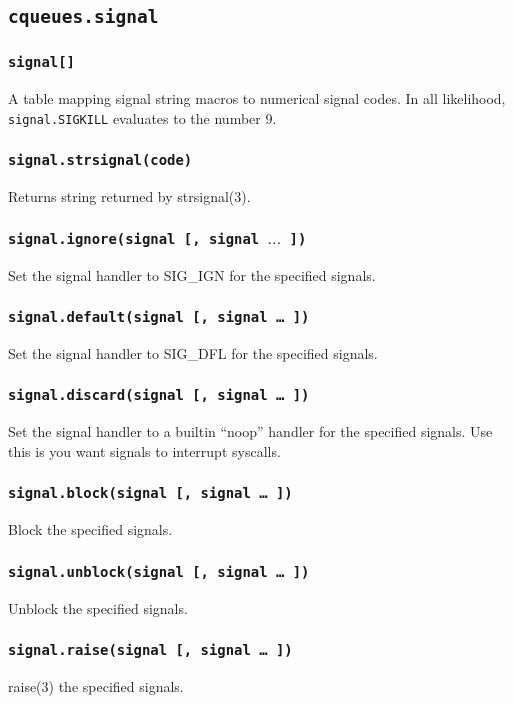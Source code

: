 \documentclass[11pt, oneside]{memoir}
\newcommand{\fn}[1]{\texttt{#1} }
\newcounter{toccols}
\newenvironment{Module}[1]{
	\subsection{\texttt{#1}}
	\addtocontents{toc}{
		\protect\begin{multicols}{\value{toccols}}
	}
}{
	\addtocontents{toc}{\protect\end{multicols}}
}
\begin{document}
\begin{Module}{cqueues.signal}

\subsubsection{\fn{signal[]}}
A table mapping signal string macros to numerical signal codes.
In all likelihood, \texttt{signal.SIGKILL} evaluates to the number 9.

\subsubsection[\fn{signal.strsignal}]{\fn{signal.strsignal(code)}}
Returns string returned by strsignal(3).

\subsubsection[\fn{signal.ignore}]{\fn{signal.ignore(signal [, signal $\ldots $ ])}}
Set the signal handler to SIG\_IGN for the specified signals.

\subsubsection[\fn{signal.default}]{\fn{signal.default(signal [, signal … ])}}
Set the signal handler to SIG\_DFL for the specified signals.

\subsubsection[\fn{signal.discard}]{\fn{signal.discard(signal [, signal … ])}}
Set the signal handler to a builtin ``noop'' handler for the specified signals. Use this is you want signals to interrupt syscalls.

\subsubsection[\fn{signal.block}]{\fn{signal.block(signal [, signal … ])}}
Block the specified signals.

\subsubsection[\fn{signal.unblock}]{\fn{signal.unblock(signal [, signal … ])}}
Unblock the specified signals.

\subsubsection[\fn{signal.raise}]{\fn{signal.raise(signal [, signal … ])}}
raise(3) the specified signals.


\end{Module}
\end{document}
